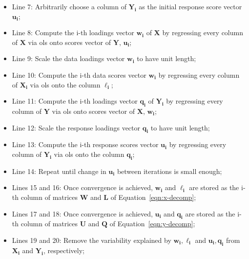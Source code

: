 \begin{itemize}
	\item  Line 7: Arbitrarily choose a column of $\mathbf{Y_i}$ as the initial response score vector $\mathbf{u_i}$;
	
	\item Line 8: Compute the i-th loadings vector $\mathbf{w_i}$  of $\mathbf{X}$  by regressing every column of $\mathbf{X}$ via \acrshort{ols} onto scores vector of $\mathbf{Y}$, $\mathbf{u_i}$;
	
	\item Line 9: Scale the data loadings vector $\mathbf{w_i}$ to have unit length;
	
	\item Line 10: Compute the i-th data scores vector $\mathbf{w_i}$ by regressing every column of $\mathbf{X_i}$ via \acrshort{ols} onto the column $\mathbf{\ell_i}$;
	
	\item 	Line 11: Compute the i-th loadings vector $\mathbf{q_i}$  of $\mathbf{Y_i}$  by regressing every column of $\mathbf{Y}$ via \acrshort{ols} onto scores vector of $\mathbf{X}$, $\mathbf{w_i}$;
	
	\item Line 12: Scale the response loadings vector $\mathbf{q_i}$ to have unit length;
	
	\item Line 13: Compute the i-th response scores vector $\mathbf{u_i}$ by regressing every column of $\mathbf{Y_i}$ via \acrshort{ols} onto the column $\mathbf{q_i}$;
	
	\item Line 14: Repeat until change in $\mathbf{u_i}$ between iterations is small enough;

	\item Lines 15 and 16: Once convergence is achieved, $\mathbf{w_i}$ and $\mathbf{\ell_i}$ are stored as the i-th column of matrices $\mathbf{W}$ and $\mathbf{L}$ of Equation~\ref{eqn:x-decomp};
	
	\item Lines 17 and 18: Once convergence is achieved, $\mathbf{u_i}$ and $\mathbf{q_i}$ are stored as the i-th column of matrices $\mathbf{U}$ and $\mathbf{Q}$ of Equation~\ref{eqn:y-decomp};
	
	\item Lines 19 and 20: Remove the variability explained by $\mathbf{w_i, \ell_i}$ and $\mathbf{u_i, q_i}$ from $\mathbf{X_i}$ and $\mathbf{Y_i}$, respectively;
	
\end{itemize}


